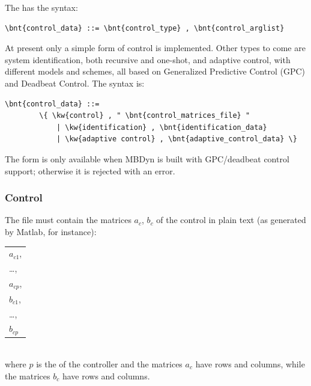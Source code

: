 The  has the syntax:
\begin{Verbatim}[commandchars=\\\{\}]
        \bnt{control_data} ::= \bnt{control_type} , \bnt{control_arglist}
\end{Verbatim}
At present only a simple form of control is implemented. Other types
to come are system identification, both recursive and one-shot, and
adaptive control, with different models and schemes, all based on 
Generalized Predictive Control (GPC) and Deadbeat Control.
The  syntax is:
\begin{Verbatim}[commandchars=\\\{\}]
    \bnt{control_data} ::=
        \{ \kw{control} , " \bnt{control_matrices_file} "
            | \kw{identification} , \bnt{identification_data}
            | \kw{adaptive control} , \bnt{adaptive_control_data} \}
\end{Verbatim}
The  form is only available when MBDyn is built
with GPC/deadbeat control support; otherwise it is rejected with an
error.

\subsubsection{Control}
The file  must contain the matrices
$ a_c $, $ b_c $ of the control in plain text (as generated by Matlab, for
instance):

\noindent
\begin{tabular}{l}
    $ a_{c1} $, \\
    \ldots,     \\
    $ a_{cp} $, \\
    $ b_{c1} $, \\
    \ldots,     \\
    $ b_{cp} $  \\
\end{tabular} \\
where $ p $ is the  of the controller and the matrices $ a_c $
have  rows and  columns, while the
matrices $ b_c $ have  rows and  columns.

